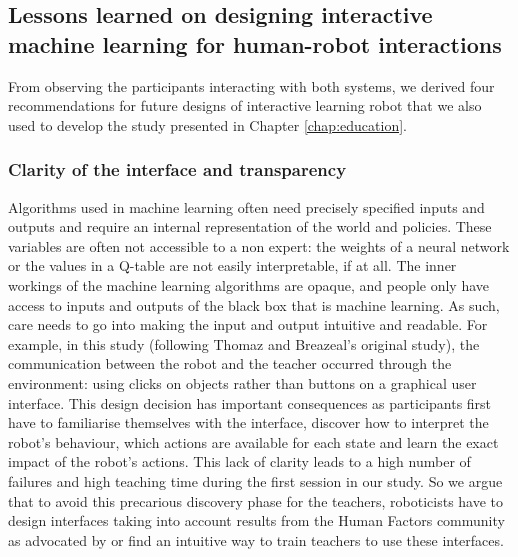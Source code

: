 
\subsection{Lessons learned on designing interactive machine learning for human-robot interactions}

From observing the participants interacting with both systems, we derived four recommendations for future designs of interactive learning robot that we also used to develop the study presented in Chapter \ref{chap:education}. 

\subsubsection{Clarity of the interface and transparency}

Algorithms used in machine learning often need precisely specified inputs and outputs and require an internal representation of the world and policies. These variables are often not accessible to a non expert: the weights of a neural network or the values in a Q-table are not easily interpretable, if at all. The inner workings of the machine learning algorithms are opaque, and people only have access to inputs and outputs of the black box that is machine learning. As such, care needs to go into making the input and output intuitive and readable. For example, in this study (following Thomaz and Breazeal's original study), the communication between the robot and the teacher occurred through the environment: using clicks on objects rather than buttons on a graphical user interface. This design decision has important consequences as participants first have to familiarise themselves with the interface, discover how to interpret the robot's behaviour, which actions are available for each state and learn the exact impact of the robot's actions. This lack of clarity leads to a high number of failures and high teaching time during the first session in our study. So we argue that to avoid this precarious discovery phase for the teachers, roboticists have to design interfaces taking into account results from the Human Factors community as advocated by \cite{adams2002critical} or find an intuitive way to train teachers to use these interfaces.

